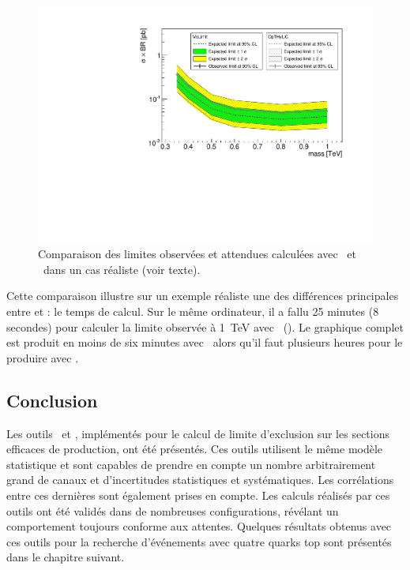 \begin{figure}[!htb]
\begin{center}
\includegraphics[scale=0.6]{figures/ExclusionPlot_Sgluon.pdf}
\caption{Comparaison des limites observées et attendues calculées avec \mclimit~et \opthylic~dans un cas réaliste (voir texte). \label{fig:ExclusionPlot_Sgluon}}
\end{center}
\end{figure} 

Cette comparaison illustre sur un exemple r\'ealiste une des diff\'erences principales entre \opthylic{} et \mclimit{}: le temps de calcul. Sur le m\^eme ordinateur, il a fallu 25 minutes (8 secondes) pour calculer la limite observ\'ee \`a 1~TeV avec \mclimit~(\opthylic). Le graphique complet est produit en moins de six minutes avec \opthylic~alors qu'il faut plusieurs heures pour le produire avec \mclimit.

\subsection{Conclusion}

Les outils \opthylic~et \tifosi, impl\'ement\'es pour le calcul de limite 
d'exclusion sur les sections efficaces de production, ont \'et\'e 
pr\'esent\'es. Ces outils utilisent le m\^eme mod\`ele statistique et sont 
capables de prendre en compte un nombre arbitrairement grand de canaux et d'incertitudes 
statistiques et syst\'ematiques. 
Les corr\'elations entre ces derni\`eres sont \'egalement prises en compte. 
Les calculs r\'ealis\'es par ces outils ont \'et\'e valid\'es dans de nombreuses configurations, r\'ev\'elant un comportement toujours conforme aux attentes.
Quelques r\'esultats obtenus avec ces outils pour la recherche d'\'ev\'enements avec quatre quarks top sont pr\'esent\'es dans le chapitre suivant.

